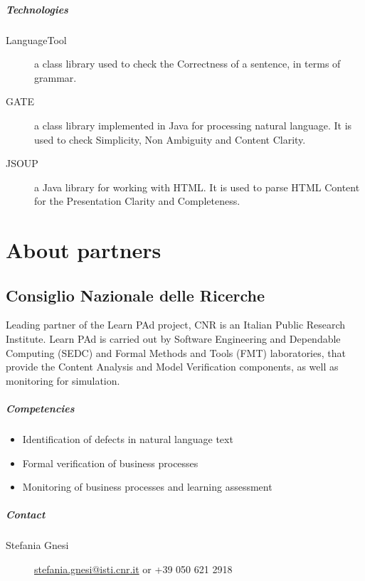 \documentclass{learnpad}
\begin{document}
\paragraph{Technologies}
\begin{description}
	\item[LanguageTool] a class library used to check the Correctness of a sentence, in terms of grammar.
	\item[GATE] a class library implemented in Java for processing natural language. It is used to check Simplicity, Non Ambiguity and Content Clarity.
	\item[JSOUP] a Java library for working with HTML. It is used to parse HTML Content for the Presentation Clarity and Completeness.
\end{description}

\chapter{About partners}
\label{ch:partners}

\section{Consiglio Nazionale delle Ricerche}
Leading partner of the Learn PAd project, CNR is an Italian Public Research
Institute.  Learn PAd is carried out by Software Engineering and Dependable
Computing (SEDC) and Formal Methods and Tools (FMT) laboratories, that provide
the Content Analysis and Model Verification components, as well as monitoring
for simulation.

\paragraph{Competencies}
\begin{itemize}
	\item Identification of defects in natural language text
	\item Formal verification of business processes
	\item Monitoring of business processes and learning assessment
\end{itemize}

\paragraph{Contact}
\begin{description}
	\item[Stefania Gnesi] \href{mailto:stefania.gnesi@isti.cnr.it}{stefania.gnesi@isti.cnr.it} or +39 050 621 2918
\end{description}
\end{document}
